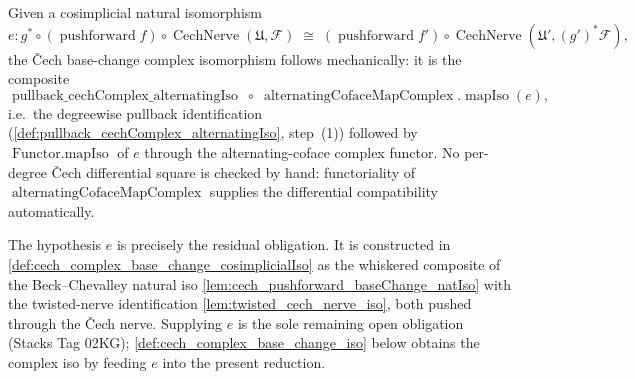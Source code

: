 \begin{definition}
  \label{def:cech_complex_base_change_iso_of_cosimplicialIso}
  Given a cosimplicial natural isomorphism
  \[
    e : g^* \circ (\operatorname{pushforward} f) \circ
        \operatorname{CechNerve}(\mathfrak{U}, \mathcal{F})
      \;\cong\;
      (\operatorname{pushforward} f') \circ
        \operatorname{CechNerve}(\mathfrak{U}', (g')^*\mathcal{F}),
  \]
  the {\v C}ech base-change complex isomorphism follows mechanically: it is the composite
  \[
    \operatorname{pullback\_cechComplex\_alternatingIso}
    \;\circ\;
    \operatorname{alternatingCofaceMapComplex}.\!\operatorname{mapIso}(e),
  \]
  i.e.\ the degreewise pullback identification
  (\cref{def:pullback_cechComplex_alternatingIso}, step~(1)) followed by
  \(\operatorname{Functor.mapIso}\) of \(e\) through the alternating-coface complex
  functor. No per-degree {\v C}ech differential square is checked by hand:
  functoriality of \(\operatorname{alternatingCofaceMapComplex}\) supplies the
  differential compatibility automatically.

  The hypothesis \(e\) is precisely the residual obligation. It is constructed in
  \cref{def:cech_complex_base_change_cosimplicialIso} as the whiskered composite of the
  Beck--Chevalley natural iso \cref{lem:cech_pushforward_baseChange_natIso} with the
  twisted-nerve identification \cref{lem:twisted_cech_nerve_iso}, both pushed through the
  {\v C}ech nerve. Supplying \(e\) is the sole remaining open obligation (Stacks Tag 02KG);
  \cref{def:cech_complex_base_change_iso} below obtains the complex
  iso by feeding \(e\) into the present reduction.
\end{definition}

